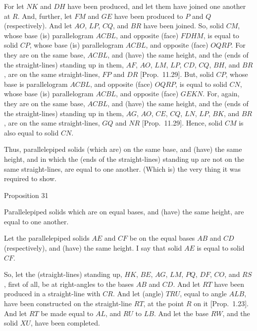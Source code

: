 For let $NK$ and $DH$ have been produced, and let them have joined
one another at $R$. And, further, let $FM$ and $GE$ have been produced
to $P$ and $Q$ (respectively). And let $AO$, $LP$, $CQ$, and
$BR$ have been joined. So, solid $CM$, whose base (is)
parallelogram $ACBL$, and opposite (face) $FDHM$, is equal to solid
$CP$, whose base (is) parallelogram $ACBL$, and opposite
(face) $OQRP$. For they are on the same base, $ACBL$, and (have) the
same height, and the (ends of the straight-lines) standing up in them,
$AF$, $AO$, $LM$, $LP$, $CD$, $CQ$, $BH$, and $BR$, are on the
same straight-lines, $FP$ and $DR$ [Prop.~11.29]. 
But,  solid $CP$, whose base is parallelogram
$ACBL$, and opposite (face) $OQRP$, is equal to solid
$CN$, whose base (is) parallelogram $ACBL$, and opposite (face)
$GEKN$. For, again, they are on the same base, $ACBL$,
and (have) the same height, and the (ends of the straight-lines) standing up
in them, $AG$, $AO$, $CE$, $CQ$, $LN$, $LP$, $BK$, and $BR$,
are on the same straight-lines, $GQ$ and $NR$ [Prop.~11.29]. Hence, solid $CM$ is also equal to solid $CN$.

Thus, parallelepiped solids (which are) on the same base,
and (have) the same height, and in which the (ends of the straight-lines)
standing up are not on the same straight-lines, are equal to one another.
(Which is) the very thing it was required to show.


\begin{center}
{\large Proposition 31}
\end{center}

Parallelepiped solids which are on equal bases,
and (have) the same height, are equal to one another.

Let the parallelepiped solids $AE$ and $CF$ be on the equal bases $AB$
and $CD$ (respectively), and (have) the same height. I say that solid
$AE$ is equal to solid $CF$.

 So, let the
(straight-lines) standing up, $HK$, $BE$, $AG$, $LM$, $PQ$, $DF$,
$CO$, and $RS$, first of all, be at right-angles to the bases $AB$
and $CD$. And let $RT$ have been produced in a straight-line with
$CR$. And let  (angle) $TRU$, equal to angle $ALB$, have been
constructed on the straight-line $RT$, at the point $R$ on it [Prop.~1.23]. And let
$RT$ be made equal to $AL$, and $RU$ to $LB$. And let the base
$RW$, and the solid $XU$,  have been completed.

\epsfysize=4in
\centerline{}

